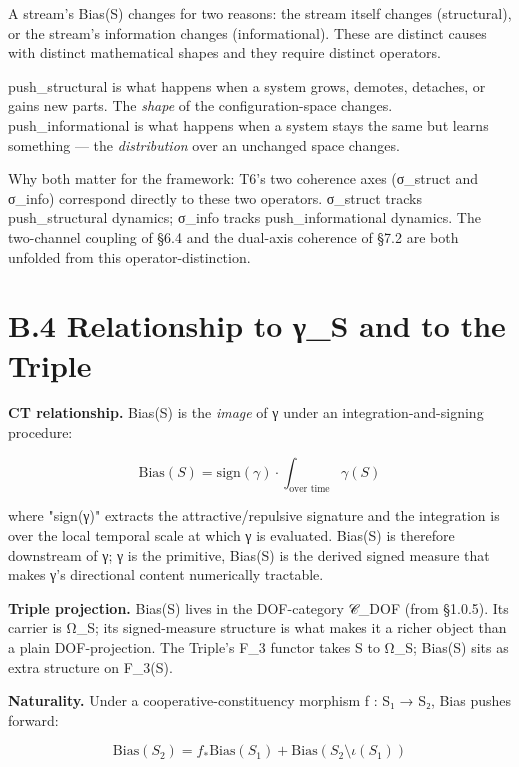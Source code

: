 \documentclass[11pt, openany]{book}
\newcommand{\sectionbreak}{\clearpage}
\begin{document}
A stream's Bias(S) changes for two reasons: the stream itself changes (structural), or the stream's information changes (informational). These are distinct causes with distinct mathematical shapes and they require distinct operators.

push\_\allowbreak{}structural is what happens when a system grows, demotes, detaches, or gains new parts. The \textit{shape} of the configuration-space changes. push\_\allowbreak{}informational is what happens when a system stays the same but learns something --- the \textit{distribution} over an unchanged space changes.

Why both matter for the framework: T6's two coherence axes (σ\_\allowbreak{}struct and σ\_\allowbreak{}info) correspond directly to these two operators. σ\_\allowbreak{}struct tracks push\_\allowbreak{}structural dynamics; σ\_\allowbreak{}info tracks push\_\allowbreak{}informational dynamics. The two-channel coupling of §6.4 and the dual-axis coherence of §7.2 are both unfolded from this operator-distinction.

\sectionbreak

\section{B.4 Relationship to γ\_\allowbreak{}S and to the Triple}

\textbf{CT relationship.} Bias(S) is the \textit{image} of γ under an integration-and-signing procedure:

$$\text{Bias}(S) = \text{sign}(\gamma) \cdot \int_{\text{over time}} \gamma(S)$$

where "sign(γ)" extracts the attractive/repulsive signature and the integration is over the local temporal scale at which γ is evaluated. Bias(S) is therefore downstream of γ; γ is the primitive, Bias(S) is the derived signed measure that makes γ's directional content numerically tractable.

\textbf{Triple projection.} Bias(S) lives in the DOF-category 𝒞\_\allowbreak{}DOF (from §1.0.5). Its carrier is Ω\_\allowbreak{}S; its signed-measure structure is what makes it a richer object than a plain DOF-projection. The Triple's F\_\allowbreak{}3 functor takes S to Ω\_\allowbreak{}S; Bias(S) sits as extra structure on F\_\allowbreak{}3(S).

\textbf{Naturality.} Under a cooperative-constituency morphism f : S₁ → S₂, Bias pushes forward:

$$\text{Bias}(S_2) = f_* \text{Bias}(S_1) + \text{Bias}(S_2 \setminus \iota(S_1))$$
\end{document}
